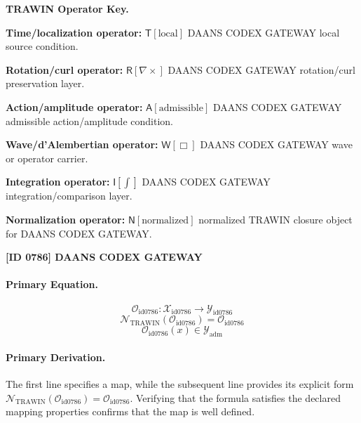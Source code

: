 \par\vspace{0.45\baselineskip}
\noindent\begin{minipage}[t]{\linewidth}
\begingroup
\small
\raggedright
\textbf{TRAWIN Operator Key.}\par
\noindent\textbf{Time/localization operator:} $\mathsf{T}\!\left[\mathrm{local}\right]$ DAANS CODEX GATEWAY local source condition.\par
\noindent\textbf{Rotation/curl operator:} $\mathsf{R}\!\left[\nabla\times\right]$ DAANS CODEX GATEWAY rotation/curl preservation layer.\par
\noindent\textbf{Action/amplitude operator:} $\mathsf{A}\!\left[\mathrm{admissible}\right]$ DAANS CODEX GATEWAY admissible action/amplitude condition.\par
\noindent\textbf{Wave/d'Alembertian operator:} $\mathsf{W}\!\left[\Box\right]$ DAANS CODEX GATEWAY wave or operator carrier.\par
\noindent\textbf{Integration operator:} $\mathsf{I}\!\left[\int\right]$ DAANS CODEX GATEWAY integration/comparison layer.\par
\noindent\textbf{Normalization operator:} $\mathsf{N}\!\left[\mathrm{normalized}\right]$ normalized TRAWIN closure object for DAANS CODEX GATEWAY.\par
\endgroup
\end{minipage}

\clearpage
\noindent\textbf{[ID 0786] DAANS CODEX GATEWAY}\par
\vspace{0.35em}
\paragraph{Primary Equation.}
\[
\mathcal{O}_{\mathrm{id0786}}:\mathcal{X}_{\mathrm{id0786}}\longrightarrow\mathcal{Y}_{\mathrm{id0786}}
\]
\[
\mathcal{N}_{\mathrm{TRAWIN}}(\mathcal{O}_{\mathrm{id0786}})=\mathcal{O}_{\mathrm{id0786}}
\]
\[
\mathcal{O}_{\mathrm{id0786}}(x)\in\mathcal{Y}_{\mathrm{adm}}
\]

\paragraph{Primary Derivation.}
The first line specifies a map, while the subsequent line provides its explicit form \( \mathcal{N}_{\mathrm{TRAWIN}}(\mathcal{O}_{\mathrm{id0786}})=\mathcal{O}_{\mathrm{id0786}} \). Verifying that the formula satisfies the declared mapping properties confirms that the map is well defined.
